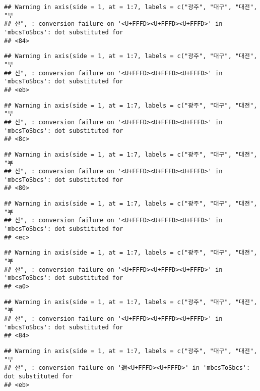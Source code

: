 \documentclass[]{article}
\begin{document}
\begin{verbatim}
## Warning in axis(side = 1, at = 1:7, labels = c("광주", "대구", "대전", "부
## 산", : conversion failure on '<U+FFFD><U+FFFD><U+FFFD>' in 'mbcsToSbcs': dot substituted for
## <84>
\end{verbatim}

\begin{verbatim}
## Warning in axis(side = 1, at = 1:7, labels = c("광주", "대구", "대전", "부
## 산", : conversion failure on '<U+FFFD><U+FFFD><U+FFFD>' in 'mbcsToSbcs': dot substituted for
## <eb>
\end{verbatim}

\begin{verbatim}
## Warning in axis(side = 1, at = 1:7, labels = c("광주", "대구", "대전", "부
## 산", : conversion failure on '<U+FFFD><U+FFFD><U+FFFD>' in 'mbcsToSbcs': dot substituted for
## <8c>
\end{verbatim}

\begin{verbatim}
## Warning in axis(side = 1, at = 1:7, labels = c("광주", "대구", "대전", "부
## 산", : conversion failure on '<U+FFFD><U+FFFD><U+FFFD>' in 'mbcsToSbcs': dot substituted for
## <80>
\end{verbatim}

\begin{verbatim}
## Warning in axis(side = 1, at = 1:7, labels = c("광주", "대구", "대전", "부
## 산", : conversion failure on '<U+FFFD><U+FFFD><U+FFFD>' in 'mbcsToSbcs': dot substituted for
## <ec>
\end{verbatim}

\begin{verbatim}
## Warning in axis(side = 1, at = 1:7, labels = c("광주", "대구", "대전", "부
## 산", : conversion failure on '<U+FFFD><U+FFFD><U+FFFD>' in 'mbcsToSbcs': dot substituted for
## <a0>
\end{verbatim}

\begin{verbatim}
## Warning in axis(side = 1, at = 1:7, labels = c("광주", "대구", "대전", "부
## 산", : conversion failure on '<U+FFFD><U+FFFD><U+FFFD>' in 'mbcsToSbcs': dot substituted for
## <84>
\end{verbatim}

\begin{verbatim}
## Warning in axis(side = 1, at = 1:7, labels = c("광주", "대구", "대전", "부
## 산", : conversion failure on '遺<U+FFFD><U+FFFD>' in 'mbcsToSbcs': dot substituted for
## <eb>
\end{verbatim}
\end{document}
